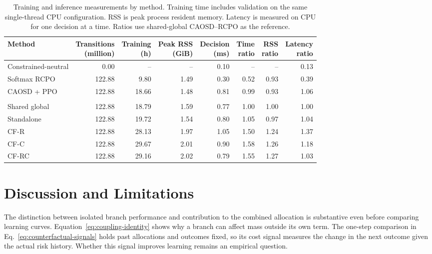 \documentclass[10pt]{article}
\begin{document}
\begin{table}[tbp]
\centering
\caption{Training and inference measurements by method. Training time includes validation on the same single-thread CPU configuration. RSS is peak process resident memory. Latency is measured on CPU for one decision at a time. Ratios use shared-global CAOSD--RCPO as the reference.}
\label{tab:training-compute}
\scriptsize
\setlength{\tabcolsep}{3pt}
\begin{tabularx}{\linewidth}{@{}Xrrrrrrr@{}}
\toprule
Method & \shortstack[r]{Transitions\\(million)} & \shortstack[r]{Training\\(h)} &
\shortstack[r]{Peak RSS\\(GiB)} & \shortstack[r]{Decision\\(ms)} & \shortstack[r]{Time\\ratio} &
\shortstack[r]{RSS\\ratio} & \shortstack[r]{Latency\\ratio} \\
\midrule
Constrained-neutral & 0.00   & --    & --   & 0.10 & --   & --   & 0.13 \\
Softmax RCPO        & 122.88 & 9.80  & 1.49 & 0.30 & 0.52 & 0.93 & 0.39 \\
CAOSD + PPO         & 122.88 & 18.66 & 1.48 & 0.81 & 0.99 & 0.93 & 1.06 \\
\addlinespace
\multicolumn{8}{@{}l}{CAOSD + RCPO} \\
\quad Shared global & 122.88 & 18.79 & 1.59 & 0.77 & 1.00 & 1.00 & 1.00 \\
\quad Standalone    & 122.88 & 19.72 & 1.54 & 0.80 & 1.05 & 0.97 & 1.04 \\
\quad CF-R          & 122.88 & 28.13 & 1.97 & 1.05 & 1.50 & 1.24 & 1.37 \\
\quad CF-C          & 122.88 & 29.67 & 2.01 & 0.90 & 1.58 & 1.26 & 1.18 \\
\quad CF-RC         & 122.88 & 29.16 & 2.02 & 0.79 & 1.55 & 1.27 & 1.03 \\
\bottomrule
\end{tabularx}
\end{table}

\section{Discussion and Limitations}
\label{sec:discussion}

The distinction between isolated branch performance and contribution to the combined allocation is substantive even before comparing learning curves. Equation~\eqref{eq:coupling-identity} shows why a branch can affect mass outside its own term. The one-step comparison in Eq.~\eqref{eq:counterfactual-signals} holds past allocations and outcomes fixed, so its cost signal measures the change in the next outcome given the actual risk history. Whether this signal improves learning remains an empirical question.
\end{document}
